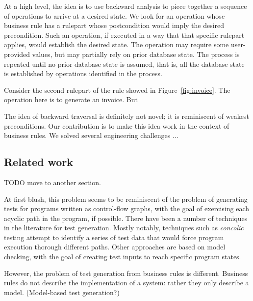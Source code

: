 At a high level, the idea is to use backward analysis to piece together a sequence of operations to arrive at 
a desired state.  We look for an operation whose business rule has a rulepart whose postcondition would imply the 
desired precondition.  Such an operation, if executed in a way that that specific rulepart applies, would establish 
the desired state.  The operation may require some user-provided values, but may partially rely on prior database
state. The process is repeated until no prior database state is assumed, that is, all the database state is 
established by operations identified in the process.  

Consider the second rulepart of the rule showed in Figure~\ref{fig:invoice}. The operation here is to generate
an invoice.  But  


The idea of backward traversal is definitely not novel; it is reminiscent of weakest preconditions.  Our
contribution is to make this idea work in the context of business rules.  We solved several engineering 
challenges ...


\subsection{Related work}

TODO move to another section.

At first blush, this problem seems to be reminiscent of the problem of generating tests for programs 
written as control-flow graphs, with the goal of exercising each acyclic path in the program, if
possible.  There have been a number of techniques in the literature for test generation. Mostly
notably, techniques such as \textit{concolic} testing attempt to identify a series of test data 
that would force program execution thorough different paths.  Other approaches are based on model
checking, with the goal of creating test inputs to reach specific program states.

However, the problem of test generation from business rules is different.  Business rules do not
describe the implementation of a system: rather they only describe a model.  (Model-based test 
generation?)
